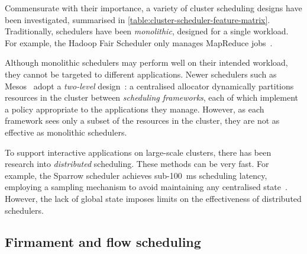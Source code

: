 

Commensurate with their importance, a variety of cluster scheduling designs have been investigated, summarised in \cref{table:cluster-scheduler-feature-matrix}. Traditionally, schedulers have been \emph{monolithic}, designed for a single workload. For example, the Hadoop Fair Scheduler only manages MapReduce jobs~\cite{HadoopFairSchedulerJIRA}.

Although monolithic schedulers may perform well on their intended workload, they cannot be targeted to different applications. Newer schedulers such as Mesos~\cite{Mesos} adopt a \emph{two-level} design~\cite[\S3.3]{Omega}: a centralised allocator dynamically partitions resources in the cluster between \emph{scheduling frameworks}, each of which implement a policy appropriate to the applications they manage. However, as each framework sees only a subset of the resources in the cluster, they are not as effective as monolithic schedulers.

To support interactive applications on large-scale clusters, there has been research into \emph{distributed} scheduling. These methods can be very fast. For example, the Sparrow scheduler achieves sub-\SI{100}{\milli\second} scheduling latency, employing a sampling mechanism to avoid maintaining any centralised state~\cite[fig.~10]{Ousterhout:2013}. However, the lack of global state imposes limits on the effectiveness of distributed schedulers.

\subsection{Firmament and flow scheduling}




